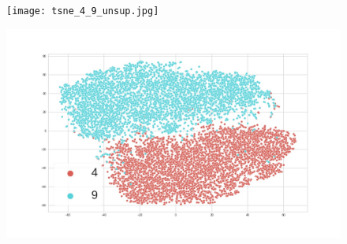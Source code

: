\documentclass[runningheads]{llncs}
\begin{document}
\begin{figure}
\centering
\begin{minipage}{.5\textwidth}
  \centering
  \texttt{[image: tsne\_4\_9\_unsup.jpg]}
  \label{tsne_un_4_9}
\end{minipage}%
\begin{minipage}{.5\textwidth}
  \centering
  \includegraphics[width=.9\linewidth]{tsne_4_9_semi.jpg}
  \label{tsne_semi_4_9}
\end{minipage}
\end{figure}
\end{document}
